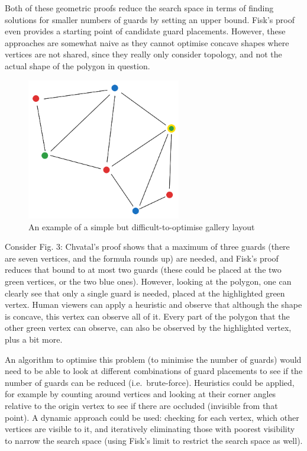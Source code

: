 \documentclass[
]{article}
\begin{document}
Both of these geometric proofs reduce the search space in terms of
finding solutions for smaller numbers of guards by setting an upper
bound. Fisk's proof even provides a starting point of candidate guard
placements. However, these approaches are somewhat naive as they cannot
optimise concave shapes where vertices are not shared, since they really
only consider topology, and not the actual shape of the polygon in
question.

\begin{figure}
\centering
\includegraphics[width=0.6\textwidth,height=\textheight]{diagrams/Complicated Gallery.png}
\caption{An example of a simple but difficult-to-optimise gallery
layout}
\end{figure}

Consider Fig. 3: Chvatal's proof shows that a maximum of three guards
(there are seven vertices, and the formula rounds up) are needed, and
Fisk's proof reduces that bound to at most two guards (these could be
placed at the two green vertices, or the two blue ones). However,
looking at the polygon, one can clearly see that only a single guard is
needed, placed at the highlighted green vertex. Human viewers can apply
a heuristic and observe that although the shape is concave, this vertex
can observe all of it. Every part of the polygon that the other green
vertex can observe, can also be observed by the highlighted vertex, plus
a bit more.

An algorithm to optimise this problem (to minimise the number of guards)
would need to be able to look at different combinations of guard
placements to see if the number of guards can be reduced
(i.e.~brute-force). Heuristics could be applied, for example by counting
around vertices and looking at their corner angles relative to the
origin vertex to see if there are occluded (invisible from that point).
A dynamic approach could be used: checking for each vertex, which other
vertices are visible to it, and iteratively eliminating those with
poorest visibility to narrow the search space (using Fisk's limit to
restrict the search space as well).
\end{document}
